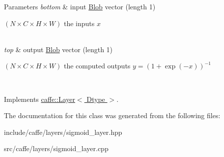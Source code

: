 \begin{DoxyParams}{Parameters}
{\em bottom} & input \hyperlink{classcaffe_1_1Blob}{Blob} vector (length 1)
\begin{DoxyEnumerate}
\item $ (N \times C \times H \times W) $ the inputs $ x $ 
\end{DoxyEnumerate}\\
\hline
{\em top} & output \hyperlink{classcaffe_1_1Blob}{Blob} vector (length 1)
\begin{DoxyEnumerate}
\item $ (N \times C \times H \times W) $ the computed outputs $ y = (1 + \exp(-x))^{-1} $ 
\end{DoxyEnumerate}\\
\hline
\end{DoxyParams}


Implements \hyperlink{classcaffe_1_1Layer_add965883f75bbf90c7a06f960cda7a1a}{caffe\+::\+Layer$<$ Dtype $>$}.



The documentation for this class was generated from the following files\+:\begin{DoxyCompactItemize}
\item 
include/caffe/layers/sigmoid\+\_\+layer.\+hpp\item 
src/caffe/layers/sigmoid\+\_\+layer.\+cpp\end{DoxyCompactItemize}

